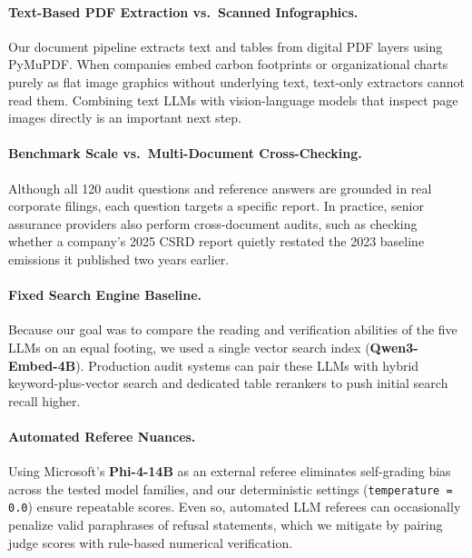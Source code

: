 \documentclass[11pt,letterpaper]{article}
\newcommand{\model}[1]{\textbf{#1}}
\begin{document}
\paragraph{Text-Based PDF Extraction vs.\ Scanned Infographics.}
Our document pipeline extracts text and tables from digital PDF layers using PyMuPDF. When companies embed carbon footprints or organizational charts purely as flat image graphics without underlying text, text-only extractors cannot read them. Combining text LLMs with vision-language models that inspect page images directly is an important next step.

\paragraph{Benchmark Scale vs.\ Multi-Document Cross-Checking.}
Although all 120 audit questions and reference answers are grounded in real corporate filings, each question targets a specific report. In practice, senior assurance providers also perform cross-document audits, such as checking whether a company's 2025 CSRD report quietly restated the 2023 baseline emissions it published two years earlier.

\paragraph{Fixed Search Engine Baseline.}
Because our goal was to compare the reading and verification abilities of the five LLMs on an equal footing, we used a single vector search index (\model{Qwen3-Embed-4B}). Production audit systems can pair these LLMs with hybrid keyword-plus-vector search and dedicated table rerankers to push initial search recall higher.

\paragraph{Automated Referee Nuances.}
Using Microsoft's \model{Phi-4-14B} as an external referee eliminates self-grading bias across the tested model families, and our deterministic settings (\texttt{temperature = 0.0}) ensure repeatable scores. Even so, automated LLM referees can occasionally penalize valid paraphrases of refusal statements, which we mitigate by pairing judge scores with rule-based numerical verification.

\end{document}
